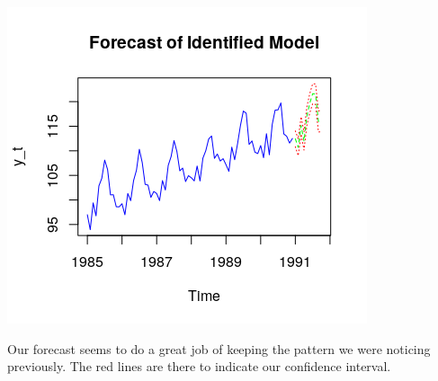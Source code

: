 \documentclass[11pt]{article}
\begin{document}
\begin{center}
\includegraphics[scale=1]{4G}
\end{center}
Our forecast seems to do a great job of keeping the pattern we were noticing previously. The red lines are there to indicate our confidence interval.
\end{document}
